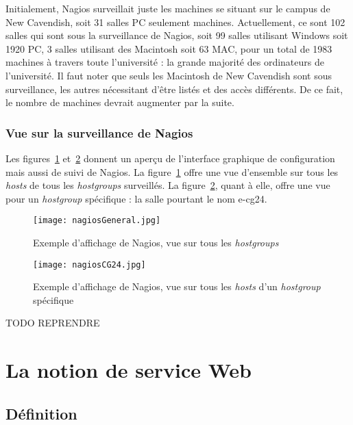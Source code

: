 Initialement, Nagios surveillait juste les machines se situant sur le campus de New Cavendish, soit 31 salles PC seulement machines.
Actuellement, ce sont 102 salles qui sont sous la surveillance de Nagios, soit 99 salles utilisant Windows soit 1920 PC, 3 salles utilisant des Macintosh soit 63 MAC, pour un total de 1983 machines \`a travers toute l'universit\'e : la grande majorit\'e des ordinateurs de l'universit\'e.
Il faut noter que seuls les Macintosh de New Cavendish sont sous surveillance, les autres n\'ecessitant d'\^etre list\'es et des acc\`es diff\'erents.
De ce fait, le nombre de machines devrait augmenter par la suite.

\subsubsection{Vue sur la surveillance de Nagios}

Les figures~\ref{figure:nagiosGeneral} et~\ref{figure:nagiosCG24}  donnent un aper\c{c}u de l'interface graphique de configuration mais aussi de suivi de Nagios.
La figure~\ref{figure:nagiosGeneral} offre une vue d'ensemble sur tous les  \textit{hosts} de tous les \textit{hostgroups} surveill\'es.
La figure~\ref{figure:nagiosCG24}, quant \`a elle, offre une vue pour un \textit{hostgroup} sp\'ecifique : la salle pourtant le nom \textsf{e-cg24}.

\begin{figure}[!ht]
	\centering
	\texttt{[image: nagiosGeneral.jpg]}
	\caption{Exemple d'affichage de Nagios, vue sur tous les \textit{hostgroups}}
	\label{figure:nagiosGeneral}
	
\end{figure}

\begin{figure}[!ht]
	\centering
	\texttt{[image: nagiosCG24.jpg]}
	\caption{Exemple d'affichage de Nagios, vue sur tous les \textit{hosts} d'un \textit{hostgroup} sp\'ecifique}
	\label{figure:nagiosCG24}
	
\end{figure}




TODO REPRENDRE



\section{La notion de service Web}
\label{section:serviceWeb}

\subsection{D\'efinition}

